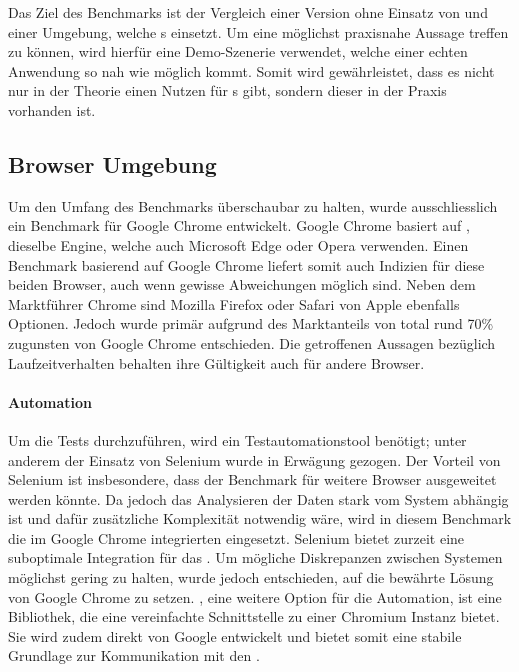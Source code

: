 Das Ziel des Benchmarks ist der Vergleich einer Version ohne Einsatz von  und einer Umgebung, welche s einsetzt. Um eine möglichst praxisnahe Aussage treffen zu können, wird hierfür eine Demo-Szenerie verwendet, welche einer echten Anwendung so nah wie möglich kommt. Somit wird gewährleistet, dass es nicht nur in der Theorie einen Nutzen für s gibt, sondern dieser in der Praxis vorhanden ist.

\subsection{Browser Umgebung}
Um den Umfang des Benchmarks überschaubar zu halten, wurde ausschliesslich ein Benchmark für Google Chrome entwickelt.
Google Chrome basiert auf , dieselbe Engine, welche auch Microsoft Edge oder Opera verwenden.
Einen Benchmark basierend auf Google Chrome liefert somit auch Indizien für diese beiden Browser, auch wenn gewisse Abweichungen möglich sind.
Neben dem Marktführer Chrome sind Mozilla Firefox oder Safari von Apple ebenfalls Optionen. Jedoch wurde primär aufgrund des Marktanteils von total rund 70\% \cite{browserUsage} zugunsten von Google Chrome entschieden.
Die getroffenen Aussagen bezüglich Laufzeitverhalten behalten ihre Gültigkeit auch für andere Browser.

\paragraph{Automation}
Um die Tests durchzuführen, wird ein Testautomationstool benötigt; unter anderem der Einsatz von Selenium wurde in Erwägung gezogen.
Der Vorteil von Selenium ist insbesondere, dass der Benchmark für weitere Browser ausgeweitet werden könnte.
Da jedoch das Analysieren der  Daten stark vom System abhängig ist und dafür zusätzliche Komplexität notwendig wäre, wird in diesem Benchmark die im Google Chrome integrierten  eingesetzt.
Selenium bietet zurzeit eine suboptimale Integration für das .
Um mögliche Diskrepanzen zwischen Systemen möglichst gering zu halten, wurde jedoch entschieden, auf die bewährte Lösung von Google Chrome zu setzen.
, eine weitere Option für die Automation, ist eine Bibliothek, die eine vereinfachte Schnittstelle zu einer Chromium Instanz bietet.
Sie wird zudem direkt von Google entwickelt und bietet somit eine stabile Grundlage zur Kommunikation mit den .

